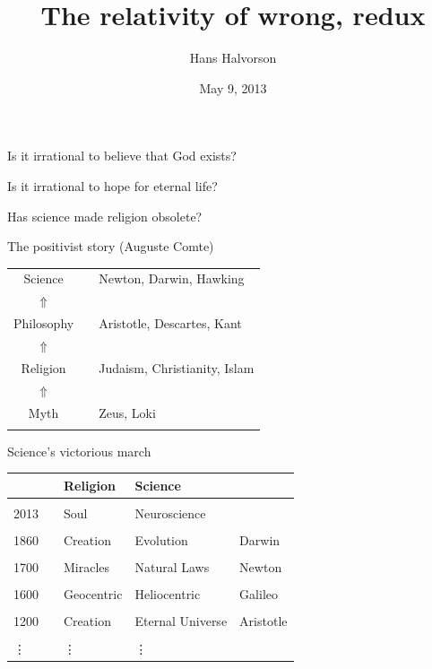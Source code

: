 \documentclass{beamer}
\title{The relativity of wrong, redux}
\author{Hans Halvorson}
\date{May 9, 2013}
\begin{document}
\def\2{\mathcal}
\def\7{\mathbb}
\begin{frame}

\maketitle

\end{frame}

\begin{frame}



{\LARGE Is it irrational to believe that God exists?} 

\vspace{2.5em}
{\LARGE Is it irrational to hope for eternal life?}

\vspace{2.5em}
{\LARGE Has science made religion obsolete?} 

\end{frame}

\begin{frame}{The positivist story (Auguste Comte)}

\begin{tabular}{cll}
  Science & &  Newton, Darwin, Hawking  \\ $\Uparrow$ \\
  Philosophy & & Aristotle, Descartes, Kant \\ $\Uparrow$ \\ 
  Religion & & Judaism, Christianity, Islam \\ $\Uparrow$ \\ 
  Myth & & Zeus, Loki  \\  \\
\end{tabular}
\end{frame}

\begin{frame}{Science's victorious march}

\begin{tabular}{lllll}
  & & Religion & Science \\ \hline \hline \\
  2013 & & Soul &  Neuroscience & \\ \\ 
  1860 & & Creation  & Evolution & Darwin \\ \\
  1700 & & Miracles  & Natural Laws & Newton \\ \\
  1600 & & Geocentric & Heliocentric & Galileo \\ \\ 
  1200 & & Creation & Eternal Universe & Aristotle\\ \\ 
  \vdots & & \vdots &  \vdots \end{tabular}
\end{frame}
\end{document}
